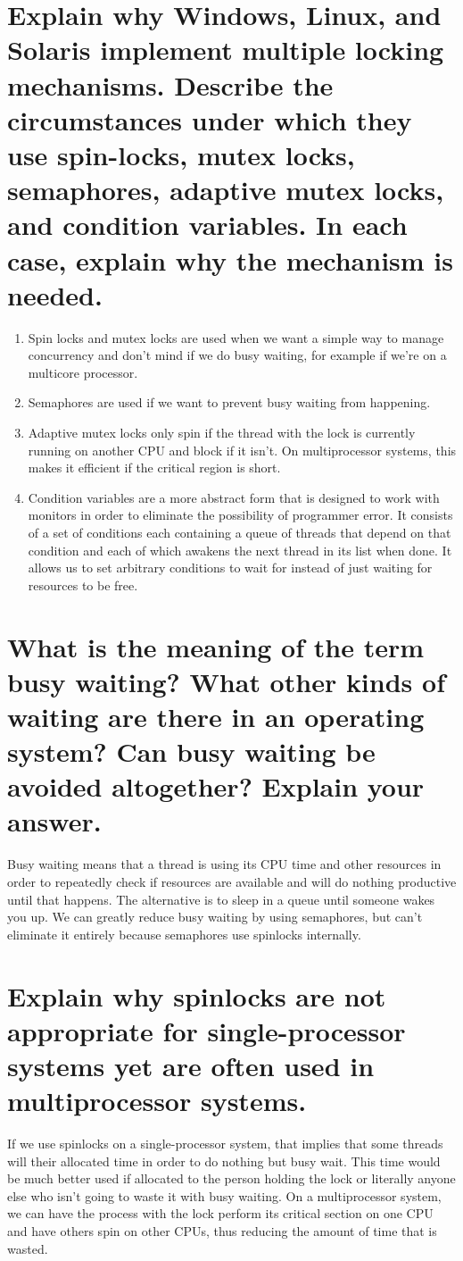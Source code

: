 \documentclass{book}%
\begin{document}
\section{Explain why Windows, Linux, and Solaris implement multiple locking mechanisms. Describe the circumstances under which they use spin-locks, mutex locks, semaphores, adaptive mutex locks, and condition variables. In each case, explain why the mechanism is needed.}
\begin{enumerate}
\item Spin locks and mutex locks are used when we want a simple way to manage concurrency and don't mind if we do busy waiting, for example if we're on a multicore processor.
\item Semaphores are used if we want to prevent busy waiting from happening.
\item Adaptive mutex locks only spin if the thread with the lock is currently running on another CPU and block if it isn't. On multiprocessor systems, this makes it efficient if the critical region is short.
\item Condition variables are a more abstract form that is designed to work with monitors in order to eliminate the possibility of programmer error. It consists of a set of conditions each containing a queue of threads that depend on that condition and each of which awakens the next thread in its list when done. It allows us to set arbitrary conditions to wait for instead of just waiting for resources to be free.
\end{enumerate}
\section{What is the meaning of the term busy waiting? What other kinds of waiting are there in an operating system? Can busy waiting be avoided altogether? Explain your answer.}
Busy waiting means that a thread is using its CPU time and other resources in order to repeatedly check if resources are available and will do nothing productive until that happens. The alternative is to sleep in a queue until someone wakes you up. We can greatly reduce busy waiting by using semaphores, but can't eliminate it entirely because semaphores use spinlocks internally.
\section{Explain why spinlocks are not appropriate for single-processor systems yet are often used in multiprocessor systems.}
If we use spinlocks on a single-processor system, that implies that some threads will their allocated time in order to do nothing but busy wait. This time would be much better used if allocated to the person holding the lock or literally anyone else who isn't going to waste it with busy waiting. On a multiprocessor system, we can have the process with the lock perform its critical section on one CPU and have others spin on other CPUs, thus reducing the amount of time that is wasted.
\end{document}
